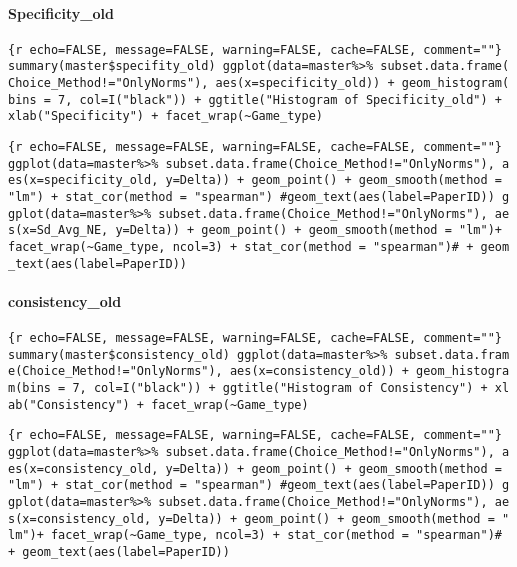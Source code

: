 \hypertarget{specificity_old}{%
\paragraph{Specificity\_old}\label{specificity_old}}

\texttt{\{r\ echo=FALSE,\ message=FALSE,\ warning=FALSE,\ cache=FALSE,\ comment=""\}\ summary(master\$specifity\_old)\ ggplot(data=master\%\textgreater{}\%\ subset.data.frame(Choice\_Method!="OnlyNorms"),\ aes(x=specificity\_old))\ +\ geom\_histogram(bins\ =\ 7,\ col=I("black"))\ +\ ggtitle("Histogram\ of\ Specificity\_old")\ +\ xlab("Specificity")\ +\ facet\_wrap(\textasciitilde{}Game\_type)}

\texttt{\{r\ echo=FALSE,\ message=FALSE,\ warning=FALSE,\ cache=FALSE,\ comment=""\}\ ggplot(data=master\%\textgreater{}\%\ subset.data.frame(Choice\_Method!="OnlyNorms"),\ aes(x=specificity\_old,\ y=Delta))\ +\ geom\_point()\ +\ geom\_smooth(method\ =\ "lm")\ +\ stat\_cor(method\ =\ "spearman")\ \#geom\_text(aes(label=PaperID))\ ggplot(data=master\%\textgreater{}\%\ subset.data.frame(Choice\_Method!="OnlyNorms"),\ aes(x=Sd\_Avg\_NE,\ y=Delta))\ +\ geom\_point()\ +\ geom\_smooth(method\ =\ "lm")+\ facet\_wrap(\textasciitilde{}Game\_type,\ ncol=3)\ +\ stat\_cor(method\ =\ "spearman")\#\ +\ geom\_text(aes(label=PaperID))}

\hypertarget{consistency_old}{%
\paragraph{consistency\_old}\label{consistency_old}}

\texttt{\{r\ echo=FALSE,\ message=FALSE,\ warning=FALSE,\ cache=FALSE,\ comment=""\}\ summary(master\$consistency\_old)\ ggplot(data=master\%\textgreater{}\%\ subset.data.frame(Choice\_Method!="OnlyNorms"),\ aes(x=consistency\_old))\ +\ geom\_histogram(bins\ =\ 7,\ col=I("black"))\ +\ ggtitle("Histogram\ of\ Consistency")\ +\ xlab("Consistency")\ +\ facet\_wrap(\textasciitilde{}Game\_type)}

\texttt{\{r\ echo=FALSE,\ message=FALSE,\ warning=FALSE,\ cache=FALSE,\ comment=""\}\ ggplot(data=master\%\textgreater{}\%\ subset.data.frame(Choice\_Method!="OnlyNorms"),\ aes(x=consistency\_old,\ y=Delta))\ +\ geom\_point()\ +\ geom\_smooth(method\ =\ "lm")\ +\ stat\_cor(method\ =\ "spearman")\ \#geom\_text(aes(label=PaperID))\ ggplot(data=master\%\textgreater{}\%\ subset.data.frame(Choice\_Method!="OnlyNorms"),\ aes(x=consistency\_old,\ y=Delta))\ +\ geom\_point()\ +\ geom\_smooth(method\ =\ "lm")+\ facet\_wrap(\textasciitilde{}Game\_type,\ ncol=3)\ +\ stat\_cor(method\ =\ "spearman")\#\ +\ geom\_text(aes(label=PaperID))}

